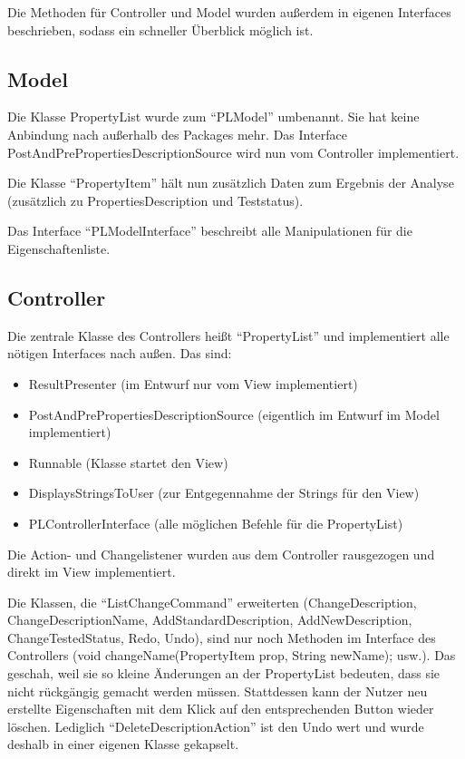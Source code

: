 \documentclass[a4paper]{scrreprt}
\begin{document}
Die Methoden für Controller und Model wurden außerdem in eigenen Interfaces beschrieben, sodass ein schneller Überblick möglich ist.

\subsection{Model}
Die Klasse PropertyList wurde zum "`PLModel"' umbenannt. Sie hat keine Anbindung nach außerhalb des Packages mehr. Das Interface PostAndPrePropertiesDescriptionSource wird nun vom Controller implementiert.

Die Klasse "`PropertyItem"' hält nun zusätzlich Daten zum Ergebnis der Analyse (zusätzlich zu PropertiesDescription und Teststatus).

Das Interface "`PLModelInterface"' beschreibt alle Manipulationen für die Eigenschaftenliste.

\subsection{Controller}
Die zentrale Klasse des Controllers heißt "`PropertyList"' und implementiert alle nötigen Interfaces nach außen. Das sind:
\begin{itemize}
	\item ResultPresenter (im Entwurf nur vom View implementiert)
	\item PostAndPrePropertiesDescriptionSource (eigentlich im Entwurf im Model implementiert)
	\item Runnable (Klasse startet den View)
	\item DisplaysStringsToUser (zur Entgegennahme der Strings für den View)
	\item PLControllerInterface (alle möglichen Befehle für die PropertyList)
\end{itemize}
Die Action- und Changelistener wurden aus dem Controller rausgezogen und direkt im View implementiert.

Die Klassen, die "`ListChangeCommand"' erweiterten (ChangeDescription, ChangeDescriptionName, AddStandardDescription, AddNewDescription, ChangeTestedStatus, Redo, Undo), sind nur noch Methoden im Interface des Controllers (void changeName(PropertyItem prop, String newName); usw.). Das geschah, weil sie so kleine Änderungen an der PropertyList bedeuten, dass sie nicht rückgängig gemacht werden müssen. Stattdessen kann der Nutzer neu erstellte Eigenschaften mit dem Klick auf den entsprechenden Button wieder löschen. Lediglich "`DeleteDescriptionAction"' ist den Undo wert und wurde deshalb in einer eigenen Klasse gekapselt.
\end{document}
